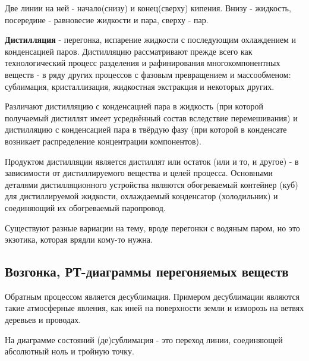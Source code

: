 \documentclass[14pt,a4paper]{scrartcl}
\begin{document}
Две линии на ней - начало(снизу) и конец(сверху) кипения. Внизу - жидкость, посередине - равновесие жидкости и пара, сверху - пар. 

\textbf{Дистилляция} - перегонка, испарение жидкости с последующим охлаждением и конденсацией паров. Дистилляцию рассматривают прежде всего как технологический процесс разделения и рафинирования многокомпонентных веществ - в ряду других процессов с фазовым превращением и массообменом: сублимация, кристаллизация, жидкостная экстракция и некоторых других. 

Различают дистилляцию с конденсацией пара в жидкость (при которой получаемый дистиллят имеет усреднённый состав вследствие перемешивания) и дистилляцию с конденсацией пара в твёрдую фазу (при которой в конденсате возникает распределение концентрации компонентов). 

Продуктом дистилляции является дистиллят или остаток (или и то, и другое) - в зависимости от дистиллируемого вещества и целей процесса. Основными деталями дистилляционного устройства являются обогреваемый контейнер (куб) для дистиллируемой жидкости, охлаждаемый конденсатор (холодильник) и соединяющий их обогреваемый паропровод.

Существуют разные вариации на тему, вроде перегонки с водяным паром, но это экзотика, которая врядли кому-то нужна.


\subsection*{Возгонка, РТ-диаграммы перегоняемых веществ}

Обратным процессом является десублимация. Примером десублимации являются такие атмосферные явления, как иней на поверхности земли и изморозь на ветвях деревьев и проводах.

На диаграмме состояний (де)сублимация - это переход линии, соединяющей абсолютный ноль и тройную точку.
\end{document}
